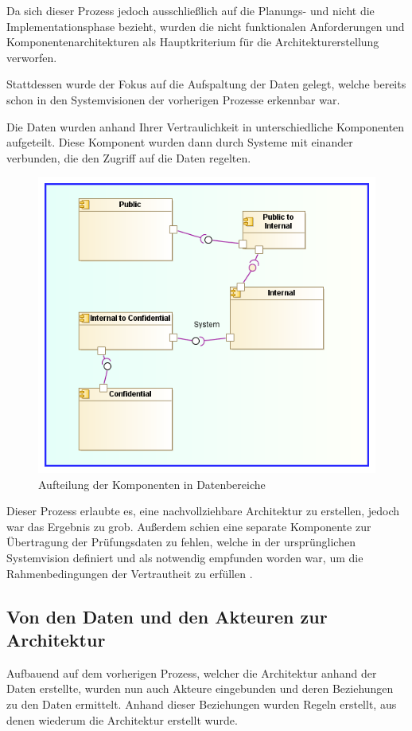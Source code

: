 Da sich dieser Prozess jedoch ausschließlich auf die Planungs- und nicht die Implementationsphase bezieht, wurden die nicht funktionalen Anforderungen und Komponentenarchitekturen als Hauptkriterium für die Architekturerstellung verworfen.

Stattdessen wurde der Fokus auf die Aufspaltung der Daten gelegt, welche bereits schon in den Systemvisionen der vorherigen Prozesse erkennbar war.

Die Daten wurden anhand Ihrer Vertraulichkeit in unterschiedliche Komponenten aufgeteilt. Diese Komponent wurden dann durch Systeme mit einander verbunden, die den Zugriff auf die Daten regelten.

\begin{figure}[!htbp]
    \centering
    \includegraphics[scale=0.7]{uml/vision3.png}
    \caption{Aufteilung der Komponenten in Datenbereiche}
\end{figure}

Dieser Prozess erlaubte es, eine nachvollziehbare Architektur zu erstellen, jedoch war das Ergebnis zu grob. Außerdem schien eine separate Komponente zur  Übertragung der Prüfungsdaten zu fehlen, welche in der ursprünglichen Systemvision definiert und als notwendig empfunden worden war, um die Rahmenbedingungen der Vertrautheit zu erfüllen \cite[7.3]{ISO_CERT}.

\subsection{Von den Daten und den Akteuren zur Architektur}
Aufbauend auf dem vorherigen Prozess, welcher die Architektur anhand der Daten erstellte, wurden nun auch Akteure eingebunden und deren Beziehungen zu den Daten ermittelt. Anhand dieser Beziehungen wurden Regeln erstellt, aus denen wiederum die Architektur erstellt wurde.

